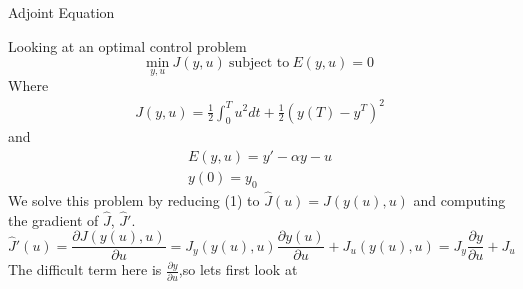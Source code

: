 \documentclass[11pt,a4paper]{report}
\begin{document}
\begin{center}

\LARGE Adjoint Equation


\end{center}
Looking at an optimal control problem $$\underset{y,u}{\text{min}} \ J(y,u) \ \text{subject to} \ E(y,u)=0$$ Where 
\begin{gather}
J(y,u) = \frac{1}{2}\int_0^Tu^2dt + \frac{1}{2}(y(T)-y^T)^2
\end{gather} 
and 
\begin{gather}
    E(y,u) = y'-\alpha y -u \\ 
    y(0)=y_0
\end{gather}
We solve this problem by reducing (1) to $\hat{J}(u) = J(y(u),u) $ and computing the gradient of $\hat{J}$, $\hat{J}'$. $$\hat{J}'(u) = \frac{\partial J(y(u),u)}{\partial u} = J_y(y(u),u)\frac{\partial y(u)}{\partial u} +J_u(y(u),u)=J_y\frac{\partial y}{\partial u} +J_u$$ The difficult term here is $\frac{\partial y}{\partial u}$,so lets first look at 
\end{document}

